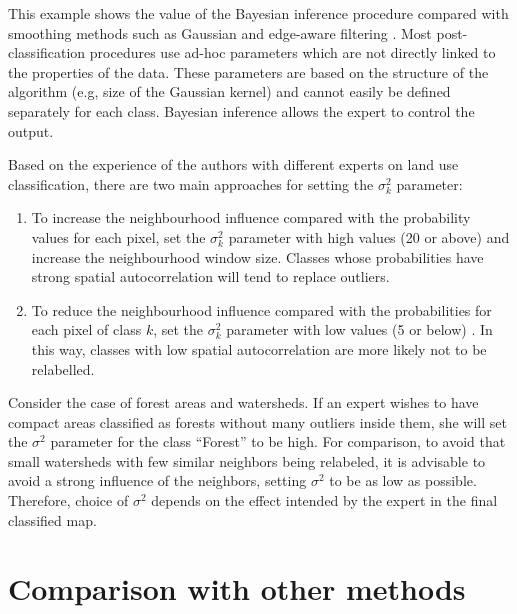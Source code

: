 \documentclass[
  shortnames]{jss}
\begin{document}
This example shows the value of the Bayesian inference procedure compared with smoothing methods such as Gaussian and edge-aware filtering \citep{Schindler2012}. Most post-classification procedures use ad-hoc parameters which are not directly linked to the properties of the data. These parameters are based on the structure of the algorithm (e.g, size of the Gaussian kernel) and cannot easily be defined separately for each class. Bayesian inference allows the expert to control the output.

Based on the experience of the authors with different experts on land use classification, there are two main approaches for setting the \(\sigma^2_{k}\) parameter:

\begin{enumerate}
\def\labelenumi{\arabic{enumi}.}
\item
  To increase the neighbourhood influence compared with the probability values for each pixel, set the \(\sigma^2_{k}\) parameter with high values (20 or above) and increase the neighbourhood window size. Classes whose probabilities have strong spatial autocorrelation will tend to replace outliers.
\item
  To reduce the neighbourhood influence compared with the probabilities for each pixel of class \(k\), set the \(\sigma^2_{k}\) parameter with low values (5 or below) . In this way, classes with low spatial autocorrelation are more likely not to be relabelled.
\end{enumerate}

Consider the case of forest areas and watersheds. If an expert wishes to have compact areas classified as forests without many outliers inside them, she will set the \(\sigma^2\) parameter for the class ``Forest'' to be high. For comparison, to avoid that small watersheds with few similar neighbors being relabeled, it is advisable to avoid a strong influence of the neighbors, setting \(\sigma^2\) to be as low as possible. Therefore, choice of \(\sigma^2\) depends on the effect intended by the expert in the final classified map.

\hypertarget{comparison-with-other-methods}{%
\section{Comparison with other methods}\label{comparison-with-other-methods}}

\renewcommand\refname{Conclusion}

\end{document}
